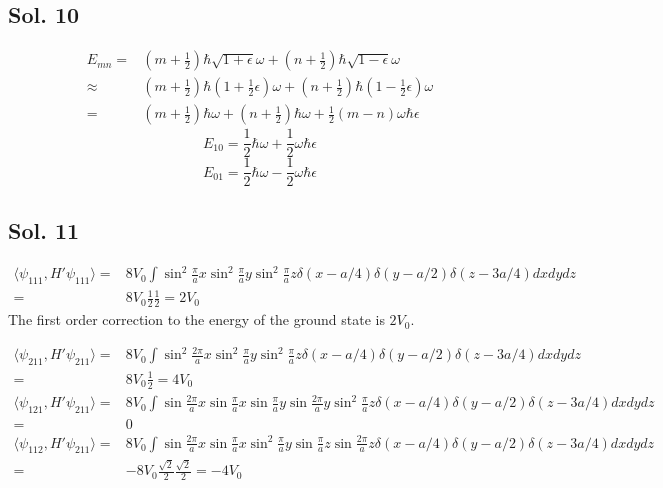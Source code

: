 \subsection*{Sol. 10}
\begin{align*}
    E_{mn}=&(m+\frac{1}{2})\hbar\sqrt{1+\epsilon}\omega + 
    (n+\frac{1}{2})\hbar\sqrt{1-\epsilon}\omega \\
    \approx&
    (m+\frac{1}{2})\hbar(1+\frac{1}{2}\epsilon)\omega + 
    (n+\frac{1}{2})\hbar(1-\frac{1}{2}\epsilon)\omega\\
    =&
    (m+\frac{1}{2})\hbar\omega + 
    (n+\frac{1}{2})\hbar\omega
    +\frac{1}{2}(m-n)\omega\hbar\epsilon
\end{align*}
$$
E_{10} = \frac{1}{2}\hbar\omega + \frac{1}{2}\omega\hbar\epsilon
$$ 
$$
E_{01} = \frac{1}{2}\hbar\omega -\frac{1}{2}\omega\hbar\epsilon
$$ 

\subsection*{Sol. 11}
\begin{align*}
    \langle\psi_{111}, H'\psi_{111}\rangle
    =&8V_0
    \int \sin^2\frac{\pi}{a}x
    \sin^2\frac{\pi}{a}y
    \sin^2\frac{\pi}{a}z
    \delta(x-a/4)
    \delta(y-a/2)
    \delta(z-3a/4)dxdydz\\
    =& 8V_0\frac{1}{2}\frac{1}{2}=2V_0
\end{align*}
The first order correction to the energy of the ground state is $2V_0.$ 

\begin{align*}
    \langle\psi_{211}, H'\psi_{211}\rangle
    =&8V_0
    \int \sin^2\frac{2\pi}{a}x
    \sin^2\frac{\pi}{a}y
    \sin^2\frac{\pi}{a}z
    \delta(x-a/4)
    \delta(y-a/2)
    \delta(z-3a/4)dxdydz\\
    =& 8V_0\frac{1}{2}=4V_0
\end{align*}
\begin{align*}
    \langle\psi_{121}, H'\psi_{211}\rangle
    =&8V_0
    \int \sin\frac{2\pi}{a}x
    \sin\frac{\pi}{a}x
    \sin\frac{\pi}{a}y
    \sin\frac{2\pi}{a}y
    \sin^2\frac{\pi}{a}z
    \delta(x-a/4)
    \delta(y-a/2)
    \delta(z-3a/4)dxdydz\\
    =&0
\end{align*}
\begin{align*}
    \langle\psi_{112}, H'\psi_{211}\rangle
    =&8V_0
    \int \sin\frac{2\pi}{a}x
    \sin\frac{\pi}{a}x
    \sin^2\frac{\pi}{a}y
    \sin\frac{\pi}{a}z
    \sin\frac{2\pi}{a}z
    \delta(x-a/4)
    \delta(y-a/2)
    \delta(z-3a/4)dxdydz\\
    =& -8V_0\frac{\sqrt{2}}{2}\frac{\sqrt{2}}{2}=-4V_0
\end{align*}


